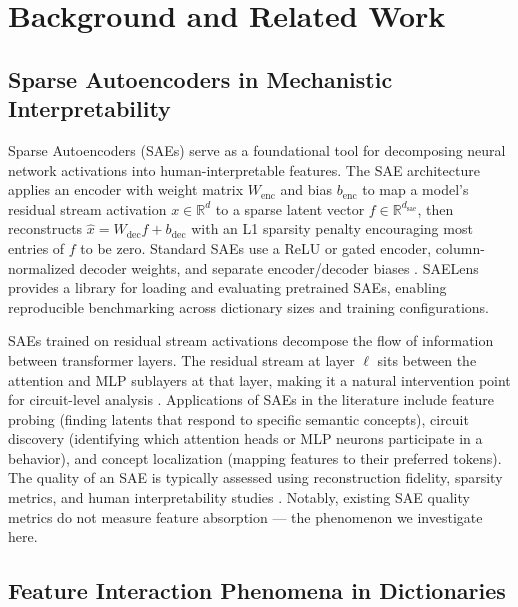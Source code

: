 \documentclass{article}
\begin{document}
\section{Background and Related Work}
\label{sec:background}

\subsection{Sparse Autoencoders in Mechanistic Interpretability}

Sparse Autoencoders (SAEs) serve as a foundational tool for decomposing neural network activations into human-interpretable features. The SAE architecture applies an encoder with weight matrix $W_{\text{enc}}$ and bias $b_{\text{enc}}$ to map a model's residual stream activation $x \in \mathbb{R}^d$ to a sparse latent vector $f \in \mathbb{R}^{d_{\text{sae}}}$, then reconstructs $\hat{x} = W_{\text{dec}} f + b_{\text{dec}}$ with an L1 sparsity penalty encouraging most entries of $f$ to be zero. Standard SAEs use a ReLU or gated encoder, column-normalized decoder weights, and separate encoder/decoder biases \citep{Bricken2023, Anthropic2023}. SAELens \citep{Bloomfield2024} provides a library for loading and evaluating pretrained SAEs, enabling reproducible benchmarking across dictionary sizes and training configurations.

SAEs trained on residual stream activations decompose the flow of information between transformer layers. The residual stream at layer $\ell$ sits between the attention and MLP sublayers at that layer, making it a natural intervention point for circuit-level analysis \citep{Elhage2021}. Applications of SAEs in the literature include feature probing (finding latents that respond to specific semantic concepts), circuit discovery (identifying which attention heads or MLP neurons participate in a behavior), and concept localization (mapping features to their preferred tokens). The quality of an SAE is typically assessed using reconstruction fidelity, sparsity metrics, and human interpretability studies \citep{Bloomfield2024}. Notably, existing SAE quality metrics do not measure feature absorption --- the phenomenon we investigate here.

\subsection{Feature Interaction Phenomena in Dictionaries}
\end{document}
